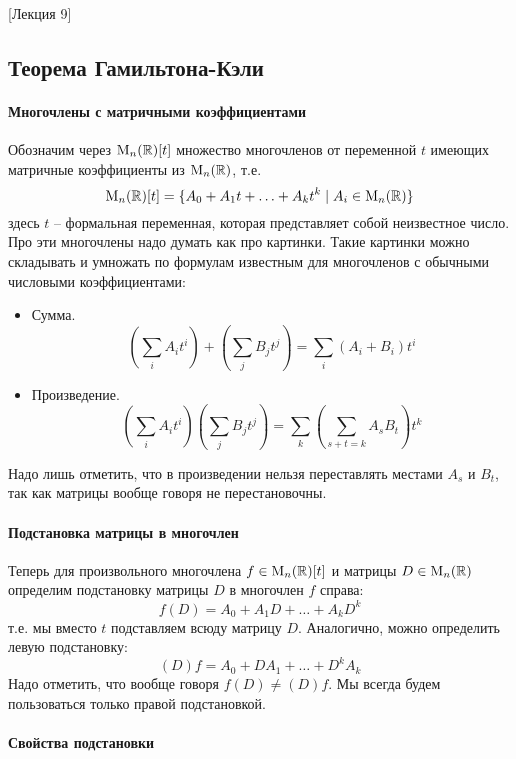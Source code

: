 [Лекция 9]


\subsection{Теорема Гамильтона-Кэли}

\paragraph{Многочлены с матричными коэффициентами}

Обозначим через $\operatorname{M}_{n}(\mathbb R)[t]$ множество многочленов от переменной $t$ имеющих матричные коэффициенты из $\operatorname{M}_{n}(\mathbb R)$, т.е.
\[
\operatorname{M}_{n}(\mathbb R)[t] = \{A_0+A_1t+\ldots + A_k t^k\mid A_i\in \operatorname{M}_{n}(\mathbb R)\}
\]
здесь $t$ -- формальная переменная, которая представляет собой неизвестное число.
Про эти многочлены надо думать как про картинки.
Такие картинки можно складывать и умножать по формулам известным для многочленов с обычными числовыми коэффициентами:
\begin{itemize}
\item Сумма.
\[
\left(\sum_{i}A_i t^i\right) +\left (\sum_{j}B_j t^j\right) = \sum_{i}(A_i+ B_i) t^i
\]

\item Произведение.
\[
\left(\sum_i A_i t^i\right)\left( \sum_j B_j t^j\right) = \sum_k \left(\sum_{s+t = k}A_s B_t\right)t^k
\]
\end{itemize}
Надо лишь отметить, что в произведении нельзя переставлять местами $A_s$ и $B_t$, так как матрицы вообще говоря не перестановочны.

\paragraph{Подстановка матрицы в многочлен} 

Теперь для произвольного многочлена $f\in\operatorname{M}_{n}(\mathbb R)[t]$ и матрицы $D\in\operatorname{M}_{n}(\mathbb R)$ определим подстановку матрицы $D$ в многочлен $f$ справа:
\[
f(D) = A_0 + A_1 D + \ldots + A_k D^k
\]
т.е. мы вместо $t$ подставляем всюду матрицу $D$.
Аналогично, можно определить левую подстановку:
\[
(D)f = A_0 + D A_1 + \ldots + D^k A_k
\]
Надо отметить, что вообще говоря $f(D)\neq (D)f$.
Мы всегда будем пользоваться только правой подстановкой.

\paragraph{Свойства подстановки}

